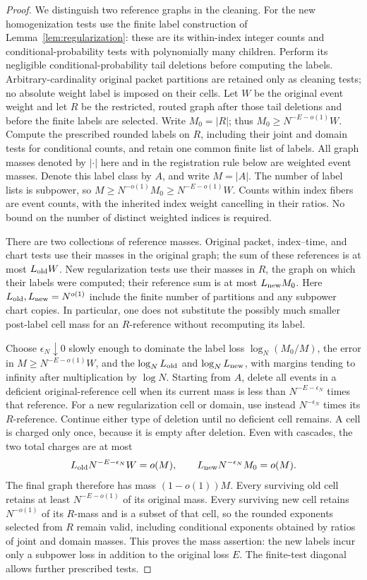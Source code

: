 \begin{proof}
We distinguish two reference graphs in the cleaning. For the new
homogenization tests use the finite label construction of
Lemma~\ref{lem:regularization}: these are its within-index integer
counts and conditional-probability tests with polynomially many
children. Perform its negligible conditional-probability tail
deletions before computing the labels. Arbitrary-cardinality original
packet partitions are retained only as cleaning tests; no absolute
weight label is imposed on their cells. Let $W$ be the original event
weight and let $R$ be the restricted, routed graph after those tail
deletions and before the finite labels are selected. Write $M_0=|R|$;
thus $M_0\ge N^{-E-o(1)}W$. Compute the prescribed rounded labels
on $R$, including their joint and domain tests for conditional counts,
and retain one common finite list of labels. All graph masses denoted
by $|\cdot|$ here and in the registration rule below are weighted
event masses. Denote this label
class by $A$, and write $M=|A|$. The number of label lists is subpower,
so $M\ge N^{-o(1)}M_0\ge N^{-E-o(1)}W$. Counts within index fibers
are event counts, with the inherited index weight cancelling in their
ratios. No bound on the number of distinct weighted indices is required.

There are two collections of reference masses. Original packet,
index--time, and chart tests use their masses in the original graph;
the sum of these references is at most $L_{\rm old}W$.
New regularization tests use their masses in $R$, the graph on which
their labels were computed; their reference sum is at most
$L_{\rm new}M_0$. Here $L_{\rm old},L_{\rm new}=N^{o(1)}$
include the finite number of partitions and any subpower chart copies.
In particular, one does not substitute the possibly much smaller
post-label cell mass for an $R$-reference without recomputing its label.

Choose $\epsilon_N\downarrow0$ slowly enough to dominate the label
loss $\log_N(M_0/M)$, the error in $M\ge N^{-E-o(1)}W$, and the
$\log_N L_{\rm old}$ and $\log_N L_{\rm new}$, with margins tending to
infinity after multiplication by $\log N$. Starting from $A$, delete
all events in a deficient original-reference cell when its current
mass is less than $N^{-E-\epsilon_N}$ times that reference. For a
new regularization cell or domain, use instead $N^{-\epsilon_N}$
times its $R$-reference. Continue either type of deletion until no
deficient cell remains. A cell is charged only once, because it is
empty after deletion. Even with cascades, the two total charges are
at most
\[
 L_{\rm old}N^{-E-\epsilon_N}W=o(M),\qquad
 L_{\rm new}N^{-\epsilon_N}M_0=o(M).
\]
The final graph therefore has mass $(1-o(1))M$. Every surviving old
cell retains at least $N^{-E-o(1)}$ of its original mass. Every
surviving new cell retains $N^{-o(1)}$ of its $R$-mass and is a
subset of that cell, so the rounded exponents selected from $R$
remain valid, including conditional exponents obtained by ratios of
joint and domain masses. This proves the mass assertion: the new labels
incur only a subpower loss in addition to the original loss $E$. The
finite-test diagonal allows further prescribed tests.


\end{proof}
